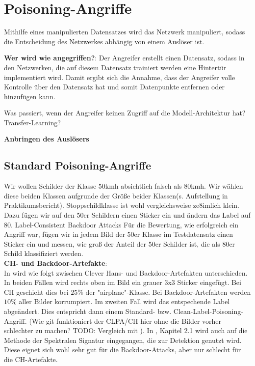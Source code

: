 \documentclass[11pt,a4paper]{article}
\numberwithin{equation}{section}
\begin{document}
	
	\section{Poisoning-Angriffe} \label{chapter_poisoningattacks}
	Mithilfe eines manipulierten Datensatzes wird das Netzwerk manipuliert, sodass die Entscheidung des Netzwerkes abhängig von einem Auslöser ist.
	
	\noindent \textbf{Wer wird wie angegriffen?}: Der Angreifer erstellt einen Datensatz, sodass in den Netzwerken, die auf diesem Datensatz trainiert werden eine Hintertür implementiert wird. Damit ergibt sich die Annahme, dass der Angreifer volle Kontrolle über den Datensatz hat und somit Datenpunkte entfernen oder hinzufügen kann.
	
	Was passiert, wenn der Angreifer keinen Zugriff auf die Modell-Architektur hat? Transfer-Learning? 
	
	\noindent \textbf{Anbringen des Auslösers}
	\subsection{Standard Poisoning-Angriffe}
	Wir wollen Schilder der Klasse 50kmh absichtlich falsch als 80kmh. Wir wählen diese beiden Klassen aufgrunde der Größe beider Klassen(s. Aufstellung in Praktikumsbericht). Stoppschildklasse ist wohl vergleichsweise ze8imlich klein.\\
	
	Dazu fügen wir auf den 50er Schildern einen Sticker ein und ändern das Label auf 80.
	Label-Consistent
	Backdoor Attacks
	Für die Bewertung, wie erfolgreich ein Angriff war, fügen wir in jedem Bild der 50er Klasse im Testdatensatz einen Sticker ein und messen, wie groß der Anteil der 50er Schilder ist, die als 80er Schild klassifiziert werden.\\
	
	\noindent \textbf{CH- und Backdoor-Artefakte}:\\
	In \cite{imagenet_unhansed_v2} wird wie folgt zwischen Clever Hans- und Backdoor-Artefakten unterschieden. In beiden Fällen wird rechts oben im Bild ein grauer 3x3 Sticker eingefügt.
	Bei CH geschieht dies bei $25 \%$ der "airplane"-Klasse. Bei Backdoor-Artefakten werden $10 \%$ aller Bilder korrumpiert. Im zweiten Fall wird das entspechende Label abgeändert. Dies entspricht dann einem Standard- bzw. Clean-Label-Poisoning-Angriff. (Wie git funktioniert der CLPA/CH hier ohne die Bilder vorher schlechter zu machen? TODO: Vergleich mit \cite{labelconsistent}). In \cite{imagenet_unhansed_v2}, Kapitel 2.1 wird auch auf die Methode der Spektralen Signatur \cite{spectral_signatures} eingegangen, die zur Detektion genutzt wird. Diese eignet sich wohl sehr gut für die Backdoor-Attacks, aber nur schlecht für die CH-Artefakte.
	
\end{document}
